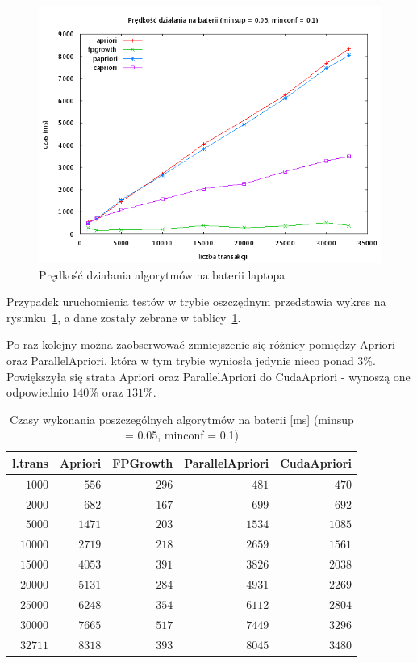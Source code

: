 \begin{figure}[H]
\centering
\includegraphics[width=1.1\textwidth]{figures/06/005_01_bat.png}
\caption{Prędkość działania algorytmów na baterii laptopa\label{rys:005_01_bat}}
\end{figure}

Przypadek uruchomienia testów w trybie oszczędnym przedstawia wykres na rysunku~\ref{rys:005_01_bat}, a dane zostały zebrane w tablicy~\ref{tab:005_01_bat}. 

Po raz kolejny można zaobserwować zmniejszenie się różnicy pomiędzy Apriori oraz ParallelApriori, która w tym trybie wyniosła jedynie nieco ponad $3\%$. Powiększyła się strata Apriori oraz ParallelApriori do CudaApriori - wynoszą one odpowiednio $140\%$ oraz $131\%$. 

\begin{table}
	\centering
	\begin{tabular}{r|r|r|r|r}
	\textbf{l.trans} & \textbf{Apriori} & \textbf{FPGrowth} & \textbf{ParallelApriori} & \textbf{CudaApriori}  \\ \hline
	$1000$ & $556$ & $296$ & $481$ & $470$ \\
	$2000$ & $682$ & $167$ & $699$ & $692$ \\
	$5000$ & $1471$ & $203$ & $1534$ & $1085$ \\
	$10000$ & $2719$ & $218$ & $2659$ & $1561$ \\
	$15000$ & $4053$ & $391$ & $3826$ & $2038$ \\
	$20000$ & $5131$ & $284$ & $4931$ & $2269$ \\
	$25000$ & $6248$ & $354$ & $6112$ & $2804$ \\
	$30000$ & $7665$ & $517$ & $7449$ & $3296$ \\
	$32711$ & $8318$ & $393$ & $8045$ & $3480$ \\
	\end{tabular}
	\caption{Czasy wykonania poszczególnych algorytmów na baterii [ms] (minsup = 0.05, minconf = 0.1)\label{tab:005_01_bat}}
\end{table}

